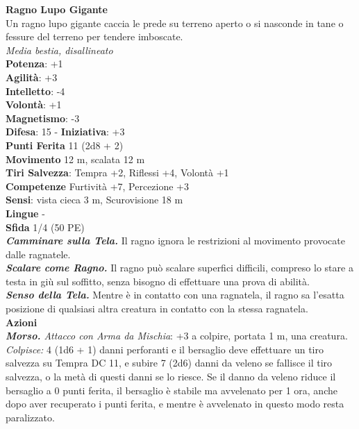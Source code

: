 \begin{multicols}{2}
\medskip\textbf{Ragno Lupo Gigante}\\
Un ragno lupo gigante caccia le prede su terreno aperto o si nasconde in tane o fessure del terreno per tendere imboscate.\\
\emph{Media bestia, disallineato}\\
\textbf{Potenza}: +1\\
\textbf{Agilità}: +3\\
\textbf{Intelletto}: -4\\
\textbf{Volontà}: +1\\
\textbf{Magnetismo}: -3\\
\textbf{Difesa}: 15 - \textbf{Iniziativa}: +3\\
\textbf{Punti Ferita} 11 (2d8 + 2)\\
\textbf{Movimento} 12 m, scalata 12 m\\
\textbf{Tiri Salvezza}:  Tempra +2, Riflessi +4, Volontà +1 \\
\textbf{Competenze} Furtività +7, Percezione +3\\
\textbf{Sensi}: vista cieca 3 m, Scurovisione 18 m\\
\textbf{Lingue} -\\
\textbf{Sfida} 1/4 (50 PE)\smallskip\\
\emph{\textbf{Camminare sulla Tela.}} Il ragno ignora le restrizioni al movimento provocate dalle ragnatele.\\
\emph{\textbf{Scalare come Ragno.}} Il ragno può scalare superfici difficili, compreso lo stare a testa in giù sul soffitto, senza bisogno di effettuare una prova di abilità.\\
\emph{\textbf{Senso della Tela.}} Mentre è in contatto con una ragnatela, il ragno sa l'esatta posizione di qualsiasi altra creatura in contatto con la stessa ragnatela.\\
\smallskip\textbf{Azioni}\\
\emph{\textbf{Morso.} Attacco con Arma da Mischia}: +3 a colpire, portata 1 m, una creatura.\\
\emph{Colpisce:} 4 (1d6 + 1) danni perforanti e il bersaglio deve effettuare un tiro salvezza su Tempra DC 11, e subire 7 (2d6) danni da veleno se fallisce il tiro salvezza, o la metà di questi danni se lo riesce. Se il danno da veleno riduce il bersaglio a 0 punti ferita, il bersaglio è stabile ma avvelenato per 1 ora, anche dopo aver recuperato i punti ferita, e mentre è avvelenato in questo modo resta paralizzato.\\


\end{multicols}
